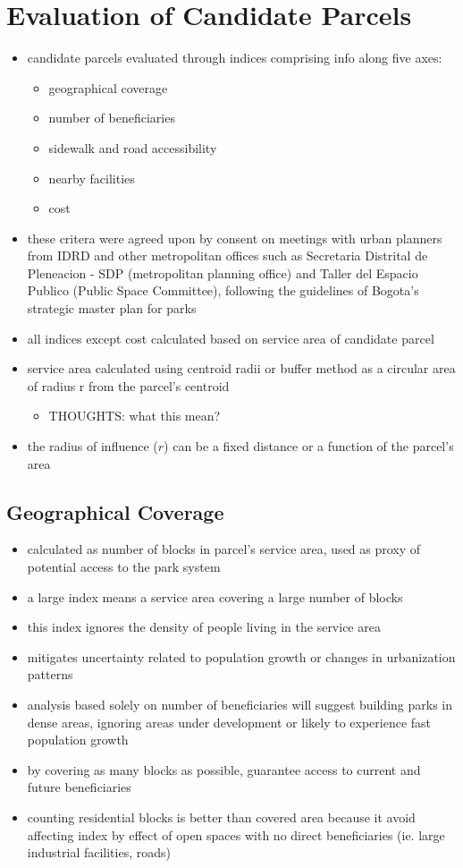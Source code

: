 \documentclass{article}
\begin{document}
\section{Evaluation of Candidate Parcels}
\begin{itemize}
\item candidate parcels evaluated through indices comprising info along five axes:
	\begin{itemize}
	\item geographical coverage
	\item number of beneficiaries
	\item sidewalk and road accessibility
	\item nearby facilities
	\item cost
	\end{itemize}
\item these critera were agreed upon by consent on meetings with urban planners from IDRD and other metropolitan offices such as Secretaria Distrital de Pleneacion - SDP (metropolitan planning office) and Taller del Espacio Publico (Public Space Committee), following the guidelines of Bogota's strategic master plan for parks
\item all indices except cost calculated based on service area of candidate parcel
\item service area calculated using centroid radii or buffer method as a circular area of radius r from the parcel's centroid
	\begin{itemize}
	\item THOUGHTS: what this mean?
	\end{itemize}
\item the radius of influence ($r$) can be a fixed distance or a function of the parcel's area
\end{itemize}
%
%
\subsection{Geographical Coverage}
\begin{itemize}
\item calculated as number of blocks in parcel's service area, used as proxy of potential access to the park system
\item a large index means a service area covering a large number of blocks
\item this index ignores the density of people living in the service area
\item mitigates uncertainty related to population growth or changes in urbanization patterns
\item analysis based solely on number of beneficiaries will suggest building parks in dense areas, ignoring areas under development or likely to experience fast population growth
\item by covering as many blocks as possible, guarantee access to current and future beneficiaries
\item counting residential blocks is better than covered area because it avoid affecting index by effect of open spaces with no direct beneficiaries (ie. large industrial facilities, roads)
\end{itemize}
%
%
\end{document}
